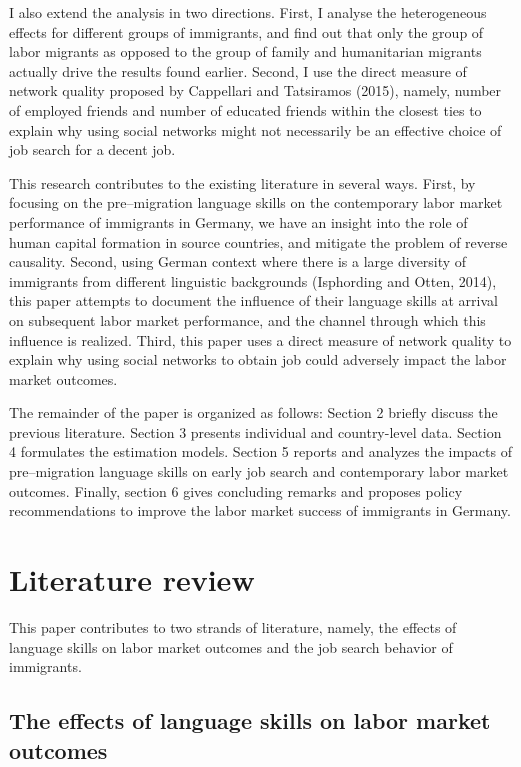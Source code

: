 \documentclass[12pt,a4paper]{article}
\begin{document}
I also extend the analysis in two directions. First, I analyse the heterogeneous effects for different groups of immigrants, and find out that only the group of labor migrants as opposed to the group of family and humanitarian migrants actually drive the results found earlier. Second, I use the direct measure of network quality proposed by Cappellari and Tatsiramos (2015), namely, number of employed friends and number of educated friends within the closest ties to explain why using social networks might not necessarily be an effective choice of job search for a decent job.

This research contributes to the existing literature in several ways. First, by focusing on the pre--migration language skills on the contemporary labor market performance of immigrants in Germany, we have an insight into the role of human capital formation in source countries, and mitigate the problem of reverse causality. Second, using German context where there is a large diversity of immigrants from different linguistic backgrounds (Isphording and Otten, 2014), this paper attempts to document the influence of their language skills at arrival on subsequent labor market performance, and the channel through which this influence is realized. Third, this paper uses a direct measure of network quality to explain why using social networks to obtain job could adversely impact the labor market outcomes.

The remainder of the paper is organized as follows: Section 2 briefly discuss the previous literature. Section 3 presents individual and country-level data. Section 4 formulates the estimation models. Section 5 reports and analyzes the impacts of pre--migration language skills on early job search and contemporary labor market outcomes. Finally, section 6 gives concluding remarks and proposes policy recommendations to improve the labor market success of immigrants in Germany.

\section{Literature review}

This paper contributes to two strands of literature, namely, the effects of language skills on labor market outcomes and the job search behavior of immigrants.

\subsection{The effects of language skills on labor market outcomes}
\end{document}
